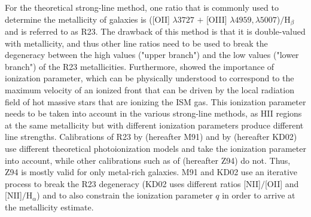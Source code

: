 \documentclass{emulateapj}
\begin{document}
For the theoretical strong-line method, one ratio that is commonly used to determine the metallicity of galaxies is ([OII] $\lambda 3727$ $+$ [OIII] $\lambda 4959,\lambda 5007$)$/$H$_\beta$ \citep{pagel79} and is referred to as R23. The drawback of this method is that it is double-valued with metallicity, and thus other line ratios need to be used to break the degeneracy between the high values ("upper branch") and the low values ("lower branch") of the R23 metallicities. Furthermore, \citet{kewley02} showed the importance of ionization parameter, which can be physically understood to correspond to the maximum velocity of an ionized front that can be driven by the local radiation field of hot massive stars that are ionizing the ISM gas. This ionization parameter needs to be taken into account in the various strong-line methods, as HII regions at the same metallicity but with different ionization parameters produce different line strengths. Calibrations of R23 by \citet{mcgaugh91} (hereafter M91) and by \citet{kewley02} (hereafter KD02) use different theoretical photoionization models and take the ionization parameter into account, while other calibrations such as of \citet{zaritsky94} (hereafter Z94) do not. Thus, Z94 is mostly valid for only metal-rich galaxies.  M91 and KD02 use an iterative process to break the R23 degeneracy  (KD02 uses different ratios [NII]$/$[OII] and [NII]$/$H$_\alpha$) and to also constrain the ionization parameter $q$ in order to arrive at the metallicity estimate.
\end{document}
